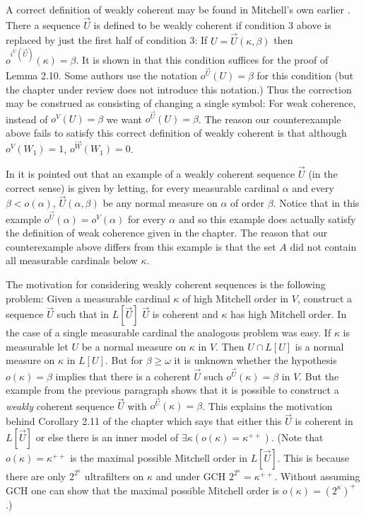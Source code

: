 \documentclass[oneside,12pt]{amsart}
\begin{document}
A correct definition of weakly coherent may be found in Mitchell's own earlier \cite{Mitchell-Revisited}.
There a sequence $\vec{U}$ is defined to be weakly coherent
if condition 3 above is replaced by just the first half of condition 3:
If $U=\vec{U}(\kappa, \beta)$ then $o^{i^{U}(\vec{U})}(\kappa) = \beta$.
It is shown in \cite{Mitchell-Revisited} that this
condition suffices for the proof of Lemma 2.10.
Some authors use the notation
$o^{\vec{U}}(U) = \beta$ for this condition (but the chapter under review does not introduce this notation.)
Thus the correction may be construed as consisting of changing a single symbol:
For weak coherence, instead of $o^V(U) = \beta$ we want $o^{\vec{U}}(U) = \beta$. The reason our
counterexample above fails to satisfy this correct definition of weakly coherent is that although
$o^{V}(W_1) = 1$, $o^{\vec{W}}(W_1) = 0$.

In \cite{Mitchell-Revisited} it is pointed out that an example of a weakly coherent sequence
$\vec{U}$ (in the correct sense) is given by letting, for every measurable cardinal $\alpha$ and every $\beta<o(\alpha)$,
$\vec{U}(\alpha,\beta)$ be any normal measure on $\alpha$ of order $\beta$. Notice that in
this example $o^{\vec{U}}(\alpha) = o^V(\alpha)$ for every $\alpha$ and so this example does
actually satisfy the definition of weak coherence given in the chapter. The reason that our
counterexample above differs from this example is that the set $A$ did not contain all measurable
cardinals below $\kappa$.

The motivation for considering weakly coherent sequences is the following problem:
Given a measurable cardinal $\kappa$ of high Mitchell order in $V$, construct a sequence $\vec{U}$ such that
in $L[\vec{U}]$ $\vec{U}$ is coherent and $\kappa$ has high Mitchell order. In the case of
a single measurable cardinal the analogous problem was easy. If $\kappa$ is measurable let $U$ be a normal
measure on $\kappa$ in $V$. Then $U\cap L[U]$ is a normal measure on $\kappa$ in
$L[U]$. But for $\beta\ge\omega$ it is unknown whether the hypothesis $o(\kappa) = \beta$
implies that there is a coherent $\vec{U}$ such $o^{\vec{U}}(\kappa) = \beta$ in $V$.
But the example from the previous paragraph shows that it is possible to construct a \emph{weakly} coherent
sequence $\vec{U}$ with $o^{\vec{U}}(\kappa) = \beta$.
This explains the motivation behind Corollary 2.11 of the chapter which says that either
this $\vec{U}$ is coherent in $L[\vec{U}]$ or else there is an inner model
of $\exists \kappa (o(\kappa) = \kappa^{++})$. (Note that $o(\kappa) = \kappa^{++}$ is the maximal
possible Mitchell order in $L[\vec{U}]$. This is because there are only $2^{2^\kappa}$ ultrafilters
on $\kappa$ and under GCH $2^{2^\kappa} = \kappa^{++}$. Without assuming GCH one can show
that the maximal possible Mitchell order is $o(\kappa) = (2^{\kappa})^{+}$.)
\end{document}
